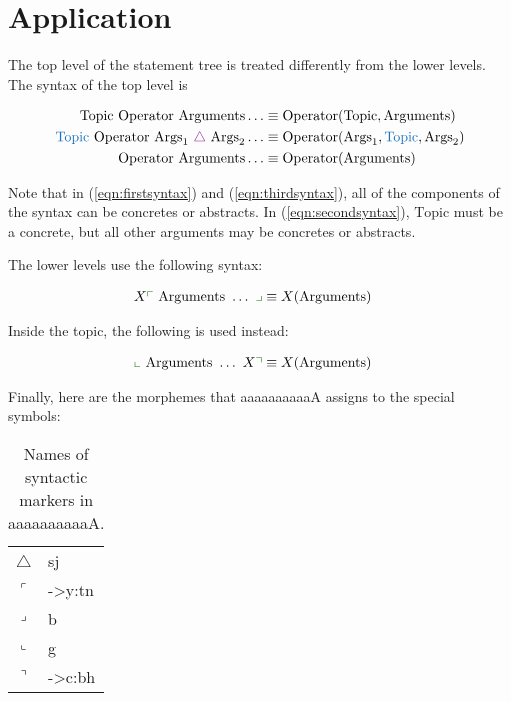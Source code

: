 \documentclass{book}
\newcommand{\lname}{aaaaaaaaaaA}
\begin{document}
\section{Application}

The top level of the statement tree is treated differently from the lower levels. The syntax of the top level is

\begin{align}
  \text{Topic } \text{Operator } \text{Arguments} \ldots &\equiv \text{Operator}(\text{Topic}, \text{Arguments})
  \label{eqn:firstsyntax} \\
  \hliii{\text{Topic }} \text{Operator } \text{Args}_1 \ \hli{\triangle}\  \text{Args}_2 \ldots
    &\equiv \text{Operator}(\text{Args}_1, \hliii{\text{Topic}}, \text{Args}_2)
  \label{eqn:secondsyntax} \\
  \text{Operator } \text{Arguments} \ldots &\equiv \text{Operator}(\text{Arguments})
  \label{eqn:thirdsyntax}
\end{align}

Note that in (\ref{eqn:firstsyntax}) and (\ref{eqn:thirdsyntax}), all of the components of the syntax can be concretes or abstracts. In (\ref{eqn:secondsyntax}), $\text{Topic}$ must be a concrete, but all other arguments may be concretes or abstracts.

The lower levels use the following syntax:

\begin{align}
  X\hlii{\ulcorner}\  \text{Arguments } \ldots\  \hlii{\lrcorner} &\equiv X(\text{Arguments})
\end{align}

Inside the topic, the following is used instead:

\begin{align}
  \hlii{\llcorner}\  \text{Arguments } \ldots\  X\hlii{\urcorner} &\equiv X(\text{Arguments})
\end{align}

Finally, here are the morphemes that \lname{} assigns to the special symbols:

\begin{table}[h]
  \caption{Names of syntactic markers in \lname.}
  \centering
  \begin{tabular}{l>{\kardinal}l}
    $\triangle$ & sj \\
    $\ulcorner$ & ->y:tn \\
    $\lrcorner$ & b \\
    $\llcorner$ & g \\
    $\urcorner$ & ->c:bh \\
  \end{tabular}
\end{table}
\end{document}
